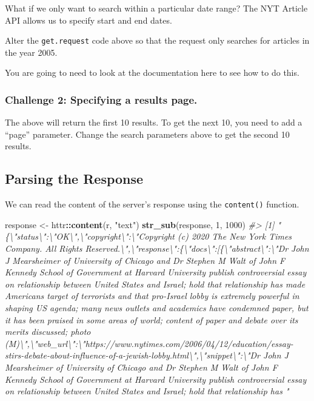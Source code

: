 \documentclass[]{book}
\newenvironment{Shaded}{\begin{snugshade}}{\end{snugshade}}
\newcommand{\KeywordTok}[1]{\textcolor[rgb]{0.13,0.29,0.53}{\textbf{#1}}}
\newcommand{\DecValTok}[1]{\textcolor[rgb]{0.00,0.00,0.81}{#1}}
\newcommand{\StringTok}[1]{\textcolor[rgb]{0.31,0.60,0.02}{#1}}
\newcommand{\CommentTok}[1]{\textcolor[rgb]{0.56,0.35,0.01}{\textit{#1}}}
\newcommand{\OperatorTok}[1]{\textcolor[rgb]{0.81,0.36,0.00}{\textbf{#1}}}
\newcommand{\NormalTok}[1]{#1}
\begin{document}
What if we only want to search within a particular date range? The NYT
Article API allows us to specify start and end dates.

Alter the \texttt{get.request} code above so that the request only
searches for articles in the year 2005.

You are going to need to look at the documentation here to see how to do
this.

\subsubsection*{Challenge 2: Specifying a results
page.}\label{challenge-2-specifying-a-results-page.}

The above will return the first 10 results. To get the next 10, you need
to add a ``page'' parameter. Change the search parameters above to get
the second 10 results.

\subsection{Parsing the Response}\label{parsing-the-response}

We can read the content of the server's response using the
\texttt{content()} function.

\begin{Shaded}
\begin{Highlighting}[]
\NormalTok{response <-}\StringTok{ }\NormalTok{httr}\OperatorTok{::}\KeywordTok{content}\NormalTok{(r, }\StringTok{"text"}\NormalTok{)}
\KeywordTok{str_sub}\NormalTok{(response, }\DecValTok{1}\NormalTok{, }\DecValTok{1000}\NormalTok{)}
\CommentTok{#> [1] "\{\textbackslash{}"status\textbackslash{}":\textbackslash{}"OK\textbackslash{}",\textbackslash{}"copyright\textbackslash{}":\textbackslash{}"Copyright (c) 2020 The New York Times Company. All Rights Reserved.\textbackslash{}",\textbackslash{}"response\textbackslash{}":\{\textbackslash{}"docs\textbackslash{}":[\{\textbackslash{}"abstract\textbackslash{}":\textbackslash{}"Dr John J Mearsheimer of University of Chicago and Dr Stephen M Walt of John F Kennedy School of Government at Harvard University publish controversial essay on relationship between United States and Israel; hold that relationship has made Americans target of terrorists and that pro-Israel lobby is extremely powerful in shaping US agenda; many news outlets and academics have condemned paper, but it has been praised in some areas of world; content of paper and debate over its merits discussed; photo (M)\textbackslash{}",\textbackslash{}"web_url\textbackslash{}":\textbackslash{}"https://www.nytimes.com/2006/04/12/education/essay-stirs-debate-about-influence-of-a-jewish-lobby.html\textbackslash{}",\textbackslash{}"snippet\textbackslash{}":\textbackslash{}"Dr John J Mearsheimer of University of Chicago and Dr Stephen M Walt of John F Kennedy School of Government at Harvard University publish controversial essay on relationship between United States and Israel; hold that relationship has "}
\end{Highlighting}
\end{Shaded}
\end{document}
